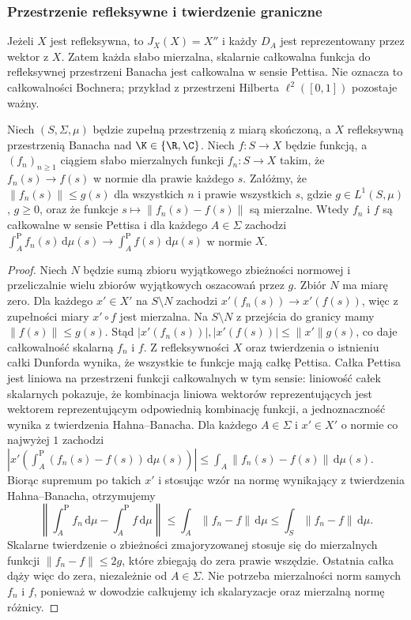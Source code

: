 \subsubsection{Przestrzenie refleksywne i twierdzenie graniczne}

\begin{uwaga}
Jeżeli $X$ jest refleksywna, to $J_X(X)=X''$ i każdy
$D_A$ jest reprezentowany przez wektor z $X$. Zatem każda
słabo mierzalna, skalarnie całkowalna funkcja do refleksywnej
przestrzeni Banacha jest całkowalna w sensie Pettisa.
Nie oznacza to całkowalności Bochnera; przykład z
przestrzeni Hilberta $\ell^2([0,1])$ pozostaje ważny.
\end{uwaga}

\begin{twierdzenie}
\label{thm:pettis-convergence15b}
Niech $(S,\Sigma,\mu)$ będzie zupełną przestrzenią z miarą
skończoną, a $X$ refleksywną przestrzenią Banacha nad
$\K\in\{\R,\C\}$. Niech $f:S\to X$ będzie funkcją, a
$(f_n)_{n\ge1}$ ciągiem słabo mierzalnych funkcji $f_n:S\to X$
takim, że
$f_n(s)\to f(s)$ w normie dla prawie każdego $s$.
Załóżmy, że $\|f_n(s)\|\le g(s)$ dla wszystkich $n$
i prawie wszystkich $s$, gdzie $g\in L^1(S,\mu)$,
$g\ge0$, oraz że funkcje
$s\mapsto\|f_n(s)-f(s)\|$ są mierzalne.
Wtedy $f_n$ i $f$ są całkowalne w sensie Pettisa i dla
każdego $A\in\Sigma$ zachodzi
$\int_A^{\mathrm P}f_n(s)\,\mathrm d\mu(s)
\to\int_A^{\mathrm P}f(s)\,\mathrm d\mu(s)$ w normie $X$.
\end{twierdzenie}
\begin{proof}
Niech $N$ będzie sumą zbioru wyjątkowego zbieżności
normowej i przeliczalnie wielu zbiorów wyjątkowych
oszacowań przez $g$. Zbiór $N$ ma miarę zero. Dla każdego
$x'\in X'$ na $S\setminus N$ zachodzi
$x'(f_n(s))\to x'(f(s))$, więc z zupełności miary
$x'\circ f$ jest mierzalna.
Na $S\setminus N$ z przejścia do granicy mamy $\|f(s)\|\le g(s)$.
Stąd $|x'(f_n(s))|,|x'(f(s))|\le\|x'\|g(s)$,
co daje całkowalność skalarną $f_n$ i $f$.
Z refleksywności $X$ oraz twierdzenia o istnieniu całki
Dunforda wynika, że wszystkie te funkcje mają całkę Pettisa.
Całka Pettisa jest liniowa na przestrzeni funkcji
całkowalnych w tym sensie: liniowość całek skalarnych
pokazuje, że kombinacja liniowa wektorów reprezentujących
jest wektorem reprezentującym odpowiednią kombinację funkcji,
a jednoznaczność wynika z twierdzenia Hahna--Banacha.
Dla każdego $A\in\Sigma$ i $x'\in X'$ o normie co najwyżej
$1$ zachodzi
$|x'(\int_A^{\mathrm P}(f_n(s)-f(s))\,\mathrm d\mu(s))|
\le\int_A\|f_n(s)-f(s)\|\,\mathrm d\mu(s)$.
Biorąc supremum po takich $x'$ i stosując wzór na normę
wynikający z twierdzenia Hahna--Banacha, otrzymujemy
\[
 \left\|\int_A^{\mathrm P}f_n\,\mathrm d\mu-
             \int_A^{\mathrm P}f\,\mathrm d\mu\right\|
 \le\int_A\|f_n-f\|\,\mathrm d\mu
 \le\int_S\|f_n-f\|\,\mathrm d\mu.
\]
Skalarne twierdzenie o zbieżności zmajoryzowanej stosuje
się do mierzalnych funkcji $\|f_n-f\|\le2g$, które zbiegają
do zera prawie wszędzie. Ostatnia całka dąży więc do zera,
niezależnie od $A\in\Sigma$. Nie potrzeba mierzalności
norm samych $f_n$ i $f$, ponieważ w dowodzie całkujemy
ich skalaryzacje oraz mierzalną normę różnicy.
\end{proof}

